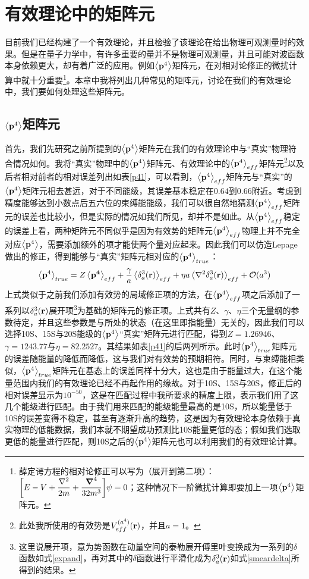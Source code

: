\documentclass[cs4size,titlepage,twoside]{ctexart}
\begin{document}
\section{有效理论中的矩阵元}
目前我们已经构建了一个有效理论，并且检验了该理论在给出物理可观测量时的效果。但是在量子力学中，有许多重要的量并不是物理可观测量，并且可能对波函数本身依赖更大，却有着广泛的应用。例如$\expval{\vb{p}^4}$矩阵元，在对相对论修正的微扰计算中就十分重要\footnote{薛定谔方程的相对论修正可以写为（展开到第二项）\cite{Lepage}：$\displaystyle\bqty{E-V+\frac{\laplacian}{2m}+\frac{\grad^4}{32m^3}}\psi=0$；这种情况下一阶微扰计算即要加上一项$\expval{\vb{p}^4}$矩阵元。}。本章中我将列出几种常见的矩阵元，讨论在我们的有效理论中，我们要如何处理这些矩阵元。
\subsection{$\expval{\vb{p}^4}$矩阵元}
首先，我们先研究之前所提到的$\expval{\vb{p}^4}$矩阵元在我们的有效理论中与“真实”物理符合情况如何。我将“真实”物理中的$\expval{\vb{p}^4}$矩阵元、有效理论中的$\expval{\vb{p}^4}_{eff}$矩阵元\footnote{此处我所使用的有效势是$V_{eff}^{(a^4)}(\vb{r})$，并且$a=1$。}以及后者相对前者的相对误差列出如表\ref{p41}，可以看到，$\expval{\vb{p}^4}_{eff}$矩阵元与“真实”的$\expval{\vb{p}^4}$矩阵元相去甚远，对于不同能级，其误差基本稳定在$0.64$到$0.66$附近。考虑到精度能够达到小数点后五六位的束缚能能级，我们可以很自然地猜测$\expval{\vb{p}^4}_{eff}$矩阵元的误差也比较小，但是实际的情况如我们所见，却并不是如此。从$\expval{\vb{p}^4}_{eff}$稳定的误差上看，两种矩阵元不同似乎是因为有效势的矩阵元$\expval{\vb{p}^4}_{eff}$物理上并不完全对应$\expval{\vb{p}^4}$，需要添加额外的项才能使两个量对应起来。因此我们可以仿造Lepage做出的修正\cite{Lepage}，得到能够与“真实”矩阵元相对应的$\expval{\vb{p}^4}_{true}$：
\begin{equation}\label{p4true}
	\expval{\vb{p}^4}_{true}=Z\expval{\vb{p^4}}_{eff}+\frac{\gamma}{a}\expval{\delta^3_a(\vb{r})}_{eff}+\eta a\expval{\laplacian{\delta^3_a(\vb{r})}}_{eff}+\mathcal{O}(a^3)
\end{equation}
上式类似于之前我们添加有效势的局域修正项的方法，在$\expval{\vb{p}^4}_{eff}$项之后添加了一系列以$\delta^3_a(\vb{r})$展开项\footnote{这里说展开项，意为势函数在动量空间的泰勒展开傅里叶变换成为一系列的$\delta$函数如式\eqref{expand}，再对其中的$\delta$函数进行平滑化成为$\delta^3_a(\vb{r})$如式\eqref{smeardelta}所得到的结果。}为基础的矩阵元的修正项。上式共有$Z$、$\gamma$、$\eta$三个无量纲的参数待定，并且这些参数是与所处的状态（在这里即指能量）无关的，因此我们可以选择10S、15S与20S能级的$\expval{\vb{p}^4}$“真实”矩阵元进行匹配，得到$Z=1.26946$、$\gamma=1243.77$与$\eta=82.2527$。其结果如表\ref{p41}的后两列所示。此时$\expval{\vb{p}^4}_{true}$矩阵元的误差随能量的降低而降低，这与我们对有效势的预期相符。同时，与束缚能相类似，$\expval{\vb{p}^4}_{true}$矩阵元在基态上的误差同样十分大，这也是由于能量过大，在这个能量范围内我们的有效理论已经不再起作用的缘故。对于10S、15S与20S，修正后的相对误差显示为$10^{-50}$，这是在匹配过程中我所要求的精度上限，表示我们用了这几个能级进行匹配。由于我们用来匹配的能级能量最高的是10S，所以能量低于10S的误差变得不稳定，甚至有逐渐升高的趋势，这是因为有效理论本身依赖于真实物理的低能数据，我们本就不期望成功预测比10S能量更低的态；假如我们选取更低的能量进行匹配，则10S之后的$\expval{\vb{p}^4}$矩阵元也可以利用我们的有效理论计算。
\end{document}
